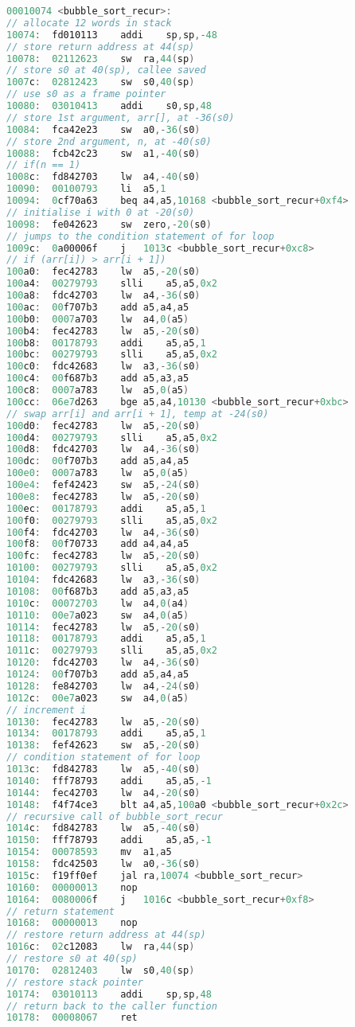 \documentclass[
    a4paper,
    oneside,
    adjustmath,
    finemath,
    itemph,
    nonfrench,
    11pt
]{oblivoir}
\begin{document}
    \begin{lstlisting}[language=C, caption=RV32I code of recursive bubble sort, label=lst:recur_RV32I]
00010074 <bubble_sort_recur>:
// allocate 12 words in stack
10074:	fd010113	addi	sp,sp,-48
// store return address at 44(sp)
10078:	02112623	sw	ra,44(sp)
// store s0 at 40(sp), callee saved
1007c:	02812423	sw	s0,40(sp)
// use s0 as a frame pointer
10080:	03010413	addi	s0,sp,48
// store 1st argument, arr[], at -36(s0)
10084:	fca42e23	sw	a0,-36(s0)
// store 2nd argument, n, at -40(s0)
10088:	fcb42c23	sw	a1,-40(s0)
// if(n == 1)
1008c:	fd842703	lw	a4,-40(s0)
10090:	00100793	li	a5,1
10094:	0cf70a63	beq	a4,a5,10168 <bubble_sort_recur+0xf4>
// initialise i with 0 at -20(s0)
10098:	fe042623	sw	zero,-20(s0)
// jumps to the condition statement of for loop
1009c:	0a00006f	j	1013c <bubble_sort_recur+0xc8>
// if (arr[i]) > arr[i + 1])
100a0:	fec42783	lw	a5,-20(s0)
100a4:	00279793	slli	a5,a5,0x2
100a8:	fdc42703	lw	a4,-36(s0)
100ac:	00f707b3	add	a5,a4,a5
100b0:	0007a703	lw	a4,0(a5)
100b4:	fec42783	lw	a5,-20(s0)
100b8:	00178793	addi	a5,a5,1
100bc:	00279793	slli	a5,a5,0x2
100c0:	fdc42683	lw	a3,-36(s0)
100c4:	00f687b3	add	a5,a3,a5
100c8:	0007a783	lw	a5,0(a5)
100cc:	06e7d263	bge	a5,a4,10130 <bubble_sort_recur+0xbc>
// swap arr[i] and arr[i + 1], temp at -24(s0)
100d0:	fec42783	lw	a5,-20(s0)
100d4:	00279793	slli	a5,a5,0x2
100d8:	fdc42703	lw	a4,-36(s0)
100dc:	00f707b3	add	a5,a4,a5
100e0:	0007a783	lw	a5,0(a5)
100e4:	fef42423	sw	a5,-24(s0)
100e8:	fec42783	lw	a5,-20(s0)
100ec:	00178793	addi	a5,a5,1
100f0:	00279793	slli	a5,a5,0x2
100f4:	fdc42703	lw	a4,-36(s0)
100f8:	00f70733	add	a4,a4,a5
100fc:	fec42783	lw	a5,-20(s0)
10100:	00279793	slli	a5,a5,0x2
10104:	fdc42683	lw	a3,-36(s0)
10108:	00f687b3	add	a5,a3,a5
1010c:	00072703	lw	a4,0(a4)
10110:	00e7a023	sw	a4,0(a5)
10114:	fec42783	lw	a5,-20(s0)
10118:	00178793	addi	a5,a5,1
1011c:	00279793	slli	a5,a5,0x2
10120:	fdc42703	lw	a4,-36(s0)
10124:	00f707b3	add	a5,a4,a5
10128:	fe842703	lw	a4,-24(s0)
1012c:	00e7a023	sw	a4,0(a5)
// increment i
10130:	fec42783	lw	a5,-20(s0)
10134:	00178793	addi	a5,a5,1
10138:	fef42623	sw	a5,-20(s0)
// condition statement of for loop
1013c:	fd842783	lw	a5,-40(s0)
10140:	fff78793	addi	a5,a5,-1
10144:	fec42703	lw	a4,-20(s0)
10148:	f4f74ce3	blt	a4,a5,100a0 <bubble_sort_recur+0x2c>
// recursive call of bubble_sort_recur
1014c:	fd842783	lw	a5,-40(s0)
10150:	fff78793	addi	a5,a5,-1
10154:	00078593	mv	a1,a5
10158:	fdc42503	lw	a0,-36(s0)
1015c:	f19ff0ef	jal	ra,10074 <bubble_sort_recur>
10160:	00000013	nop
10164:	0080006f	j	1016c <bubble_sort_recur+0xf8>
// return statement
10168:	00000013	nop
// restore return address at 44(sp)
1016c:	02c12083	lw	ra,44(sp)
// restore s0 at 40(sp)
10170:	02812403	lw	s0,40(sp)
// restore stack pointer
10174:	03010113	addi	sp,sp,48
// return back to the caller function
10178:	00008067	ret
    \end{lstlisting}
\end{document}
